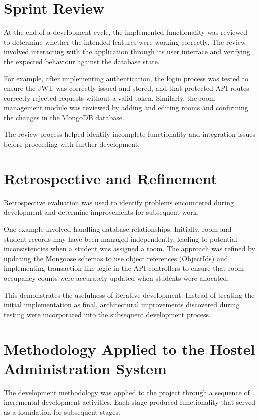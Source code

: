 \section{Sprint Review}

At the end of a development cycle, the implemented functionality was reviewed to determine whether the intended features were working correctly. The review involved interacting with the application through its user interface and verifying the expected behaviour against the database state.

For example, after implementing authentication, the login process was tested to ensure the JWT was correctly issued and stored, and that protected API routes correctly rejected requests without a valid token. Similarly, the room management module was reviewed by adding and editing rooms and confirming the changes in the MongoDB database.

The review process helped identify incomplete functionality and integration issues before proceeding with further development.

\section{Retrospective and Refinement}

Retrospective evaluation was used to identify problems encountered during development and determine improvements for subsequent work.

One example involved handling database relationships. Initially, room and student records may have been managed independently, leading to potential inconsistencies when a student was assigned a room. The approach was refined by updating the Mongoose schemas to use object references (ObjectIds) and implementing transaction-like logic in the API controllers to ensure that room occupancy counts were accurately updated when students were allocated.

This demonstrates the usefulness of iterative development. Instead of treating the initial implementation as final, architectural improvements discovered during testing were incorporated into the subsequent development process.

\section{Methodology Applied to the Hostel Administration System}

The development methodology was applied to the project through a sequence of incremental development activities. Each stage produced functionality that served as a foundation for subsequent stages.

